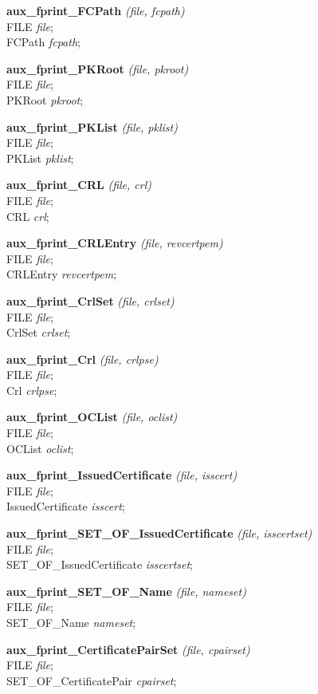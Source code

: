 {\bf aux\_fprint\_FCPath} {\em (file, fcpath)} \\
FILE {\em *file}; \\
FCPath {\em *fcpath};

{\bf aux\_fprint\_PKRoot} {\em (file, pkroot)} \\
FILE {\em *file}; \\
PKRoot {\em *pkroot};

{\bf aux\_fprint\_PKList} {\em (file, pklist)} \\
FILE {\em *file}; \\
PKList {\em *pklist};

{\bf aux\_fprint\_CRL} {\em (file, crl)} \\
FILE {\em *file}; \\
CRL {\em *crl};

{\bf aux\_fprint\_CRLEntry} {\em (file, revcertpem)} \\
FILE {\em *file}; \\
CRLEntry {\em *revcertpem};

{\bf aux\_fprint\_CrlSet} {\em (file, crlset)} \\
FILE {\em *file}; \\
CrlSet {\em *crlset};

{\bf aux\_fprint\_Crl} {\em (file, crlpse)} \\
FILE {\em *file}; \\
Crl {\em *crlpse};

{\bf aux\_fprint\_OCList} {\em (file, oclist)} \\
FILE {\em *file}; \\
OCList {\em *oclist};

{\bf aux\_fprint\_IssuedCertificate} {\em (file, isscert)} \\
FILE {\em *file}; \\
IssuedCertificate {\em *isscert};

{\bf aux\_fprint\_SET\_OF\_IssuedCertificate} {\em (file, isscertset)} \\
FILE {\em *file}; \\
SET\_OF\_IssuedCertificate {\em *isscertset};

{\bf aux\_fprint\_SET\_OF\_Name} {\em (file, nameset)} \\
FILE {\em *file}; \\
SET\_OF\_Name {\em *nameset};

{\bf aux\_fprint\_CertificatePairSet} {\em (file, cpairset)} \\
FILE {\em *file}; \\
SET\_OF\_CertificatePair {\em *cpairset};


